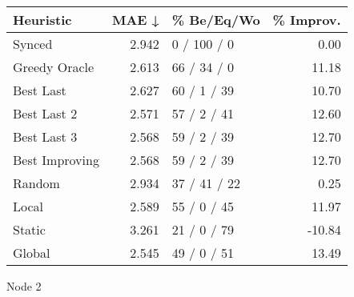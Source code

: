 \begin{tabular}{lrlr}
\toprule
\textbf{Heuristic} & \textbf{MAE ↓} & \textbf{\% Be/Eq/Wo} & \textbf{\% Improv.} \\
\midrule
            Synced &          2.942 &          0 / 100 / 0 &                0.00 \\
     Greedy Oracle &          2.613 &          66 / 34 / 0 &               11.18 \\
         Best Last &          2.627 &          60 / 1 / 39 &               10.70 \\
       Best Last 2 &          2.571 &          57 / 2 / 41 &               12.60 \\
       Best Last 3 &          2.568 &          59 / 2 / 39 &               12.70 \\
    Best Improving &          2.568 &          59 / 2 / 39 &               12.70 \\
            Random &          2.934 &         37 / 41 / 22 &                0.25 \\
             Local &          2.589 &          55 / 0 / 45 &               11.97 \\
            Static &          3.261 &          21 / 0 / 79 &              -10.84 \\
            Global &          2.545 &          49 / 0 / 51 &               13.49 \\
\bottomrule
\end{tabular}
\caption{Node 2}
\label{tab:ds_iid_lr01_le1_bs2_2}
